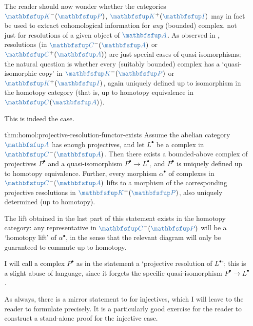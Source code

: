 The reader should now wonder whether the categories
$\categ{K}^-(\categ{P})$, $\categ{K}^+(\categ{I})$ may in fact be used
to extract cohomological information for \emph{any} (bounded) complex,
not just for resolutions of a given object of $\categ{A}$.  As
observed in
,
resolutions (in $\categ{C}^-(\categ{A})$ or $\categ{C}^+(\categ{A})$)
are just special cases of quasi-isomorphisms; the natural question is
whether every (suitably bounded) complex has a `quasi-isomorphic copy'
in $\categ{K}^-(\categ{P})$ or $\categ{K}^+(\categ{I})$, again
uniquely defined up to isomorphism in the homotopy category (that is,
up to homotopy equivalence in $\categ{C}(\categ{A})$).

This is indeed the case.

\begin{thm}{}{thm:homol:projective-resolution-functor-exists}
  Assume the abelian category $\categ{A}$ has enough projectives, and
  let $L^\bullet$ be a complex in $\categ{C}^-(\categ{A})$.  Then
  there exists a bounded-above complex of projectives $P^\bullet$ and
  a quasi-isomorphism $P^\bullet \to L^\bullet$, and $P^\bullet$ is
  uniquely defined up to homotopy equivalence. Further, every morphism
  $\alpha^\bullet$ of complexes in $\categ{C}^-(\categ{A})$ lifts to a
  morphism of the corresponding projective resolutions in
  $\categ{K}^-(\categ{P})$, also uniquely determined (up to homotopy).
\end{thm}

The lift obtained in the last part of this statement exists in the
homotopy category: any representative in $\categ{C}^-(\categ{P})$ will
be a `homotopy lift' of $\alpha^\bullet$, in the sense that the
relevant diagram will only be guaranteed to commute up to homotopy.

I will call a complex $P^\bullet$ as in the statement a `projective
resolution of $L^\bullet$'; this is a slight abuse of language, since
it forgets the specific quasi-isomorphism $P^\bullet \to L^\bullet$.

As always, there is a mirror statement to 
for injectives, which I will leave to the reader to formulate
precisely. It is a particularly good exercise for the reader to
construct a stand-alone proof for the injective case.

